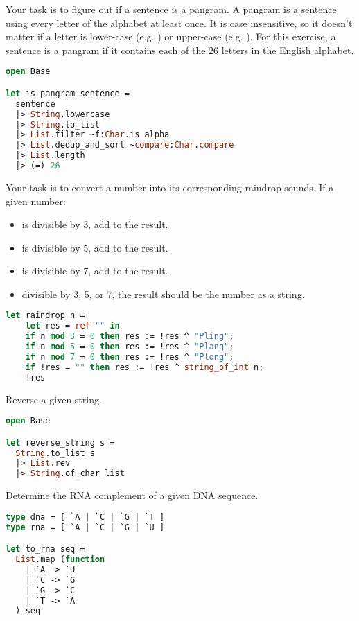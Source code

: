 Your task is to figure out if a sentence is a pangram.
A pangram is a sentence using every letter of the alphabet at least once.
It is case insensitive, so it doesn't matter if a letter is lower-case (e.g. ) or upper-case (e.g. ).
For this exercise, a sentence is a pangram if it contains each of the 26 letters in the English alphabet.

\begin{lstlisting}[language=OCaml]
open Base

let is_pangram sentence =
  sentence
  |> String.lowercase
  |> String.to_list
  |> List.filter ~f:Char.is_alpha
  |> List.dedup_and_sort ~compare:Char.compare
  |> List.length
  |> (=) 26
\end{lstlisting}

Your task is to convert a number into its corresponding raindrop sounds.
If a given number:

\begin{itemize}
  \item is divisible by 3, add  to the result.
  \item is divisible by 5, add  to the result.
  \item is divisible by 7, add  to the result.
  \item {} divisible by 3, 5, or 7, the result should be the number as a string.
\end{itemize}

\begin{lstlisting}[language=OCaml]
let raindrop n =
	let res = ref "" in
	if n mod 3 = 0 then res := !res ^ "Pling";
	if n mod 5 = 0 then res := !res ^ "Plang";
	if n mod 7 = 0 then res := !res ^ "Plong";
	if !res = "" then res := !res ^ string_of_int n;
	!res
\end{lstlisting}

Reverse a given string.

\begin{lstlisting}[language=OCaml]
open Base

let reverse_string s =
  String.to_list s 
  |> List.rev 
  |> String.of_char_list
\end{lstlisting}

Determine the RNA complement of a given DNA sequence.

\begin{lstlisting}[language=OCaml]
type dna = [ `A | `C | `G | `T ]
type rna = [ `A | `C | `G | `U ]

let to_rna seq =
  List.map (function
  	| `A -> `U
    | `C -> `G
    | `G -> `C
    | `T -> `A
  ) seq
\end{lstlisting}

